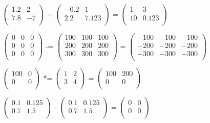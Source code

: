 \documentclass{article}
\begin{document}
\Large
$\begin{pmatrix}
1.2 & 2\\
7.8 & -7\\
\end{pmatrix}$
+
$\begin{pmatrix}
-0.2 & 1\\
2.2 & 7.123\\
\end{pmatrix}$
=
$\begin{pmatrix}
1 & 3\\
10 & 0.123\\
\end{pmatrix}$

$\begin{pmatrix}
0 & 0 & 0\\
0 & 0 & 0\\
0 & 0 & 0\\
\end{pmatrix}$
-=
$\begin{pmatrix}
100 & 100 & 100\\
200 & 200 & 200\\
300 & 300 & 300\\
\end{pmatrix}$
=
$\begin{pmatrix}
-100 & -100 & -100\\
-200 & -200 & -200\\
-300 & -300 & -300\\
\end{pmatrix}$

$\begin{pmatrix}
100 & 0\\
0 & 0\\
\end{pmatrix}$
*=
$\begin{pmatrix}
1 & 2\\
3 & 4\\
\end{pmatrix}$
=
$\begin{pmatrix}
100 & 200\\
0 & 0\\
\end{pmatrix}$

$\begin{pmatrix}
0.1 & 0.125\\
0.7 & 1.5\\
\end{pmatrix}$
-
$\begin{pmatrix}
0.1 & 0.125\\
0.7 & 1.5\\
\end{pmatrix}$
=
$\begin{pmatrix}
0 & 0\\
0 & 0\\
\end{pmatrix}$
\end{document}
